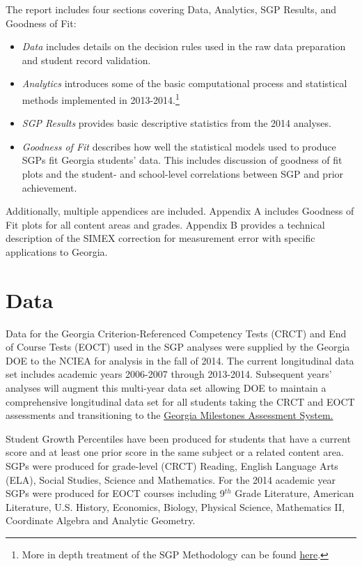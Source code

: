\documentclass[12pt]{article}
\begin{document}
The report includes four sections covering Data, Analytics, SGP Results,
and Goodness of Fit:

\begin{itemize}
\itemsep1pt\parskip0pt
\item
  \emph{Data} includes details on the decision rules used in the raw
  data preparation and student record validation.
\item
  \emph{Analytics} introduces some of the basic computational process
  and statistical methods implemented in 2013-2014.\footnote{More in
    depth treatment of the SGP Methodology can be found
    \href{https://github.com/CenterForAssessment/SGP_Resources/tree/master/articles}{here}.}
\item
  \emph{SGP Results} provides basic descriptive statistics from the 2014
  analyses.
\item
  \emph{Goodness of Fit} describes how well the statistical models used
  to produce SGPs fit Georgia students' data. This includes discussion
  of goodness of fit plots and the student- and school-level
  correlations between SGP and prior achievement.
\end{itemize}

Additionally, multiple appendices are included. Appendix A includes
Goodness of Fit plots for all content areas and grades. Appendix B
provides a technical description of the SIMEX correction for measurement
error with specific applications to Georgia.

\section{Data}\label{data}

Data for the Georgia Criterion-Referenced Competency Tests (CRCT) and
End of Course Tests (EOCT) used in the SGP analyses were supplied by the
Georgia DOE to the NCIEA for analysis in the fall of 2014. The current
longitudinal data set includes academic years 2006-2007 through
2013-2014. Subsequent years' analyses will augment this multi-year data
set allowing DOE to maintain a comprehensive longitudinal data set for
all students taking the CRCT and EOCT assessments and transitioning to
the
\href{http://www.gadoe.org/Curriculum-Instruction-and-Assessment/Assessment/Pages/Georgia-Milestones-Assessment-System.aspx}{Georgia
Milestones Assessment System.}

Student Growth Percentiles have been produced for students that have a
current score and at least one prior score in the same subject or a
related content area. SGPs were produced for grade-level (CRCT) Reading,
English Language Arts (ELA), Social Studies, Science and Mathematics.
For the 2014 academic year SGPs were produced for EOCT courses including
9\(^{th}\) Grade Literature, American Literature, U.S. History,
Economics, Biology, Physical Science, Mathematics II, Coordinate Algebra
and Analytic Geometry.
\end{document}

